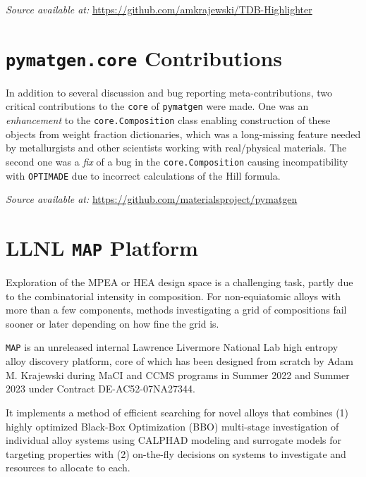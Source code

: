 \hspace{24pt} 
\textit{Source available at:} 
\href{https://github.com/amkrajewski/TDB-Highlighter}{https://github.com/amkrajewski/TDB-Highlighter}



\section{\texttt{pymatgen.core} Contributions} \label{osoft:sec:pymatgen}

In addition to several discussion and bug reporting meta-contributions, two critical contributions to the \texttt{core} of \texttt{pymatgen} were made. One was an \emph{enhancement} to the \texttt{core.Composition} class enabling construction of these objects from weight fraction dictionaries, which was a long-missing feature needed by metallurgists and other scientists working with real/physical materials. The second one was a \emph{fix} of a bug in the \texttt{core.Composition} causing incompatibility with \texttt{OPTIMADE} due to incorrect calculations of the Hill formula.

\hspace{24pt} 
\textit{Source available at:} 
\href{https://github.com/materialsproject/pymatgen}{https://github.com/materialsproject/pymatgen}


\section{LLNL \texttt{MAP} Platform} \label{osoft:sec:map}

Exploration of the MPEA or HEA design space is a challenging task, partly due to the combinatorial intensity in composition. For non-equiatomic alloys with more than a few components, methods investigating a grid of compositions fail sooner or later depending on how fine the grid is.

\texttt{MAP} is an unreleased internal Lawrence Livermore National Lab high entropy alloy discovery platform, core of which has been designed from scratch by Adam M. Krajewski during MaCI and CCMS programs in Summer 2022 and Summer 2023 under Contract DE-AC52-07NA27344.

It implements a method of efficient searching for novel alloys that combines (1) highly optimized Black-Box Optimization (BBO) multi-stage investigation of individual alloy systems using CALPHAD modeling and surrogate models for targeting properties with (2) on-the-fly decisions on systems to investigate and resources to allocate to each. 


